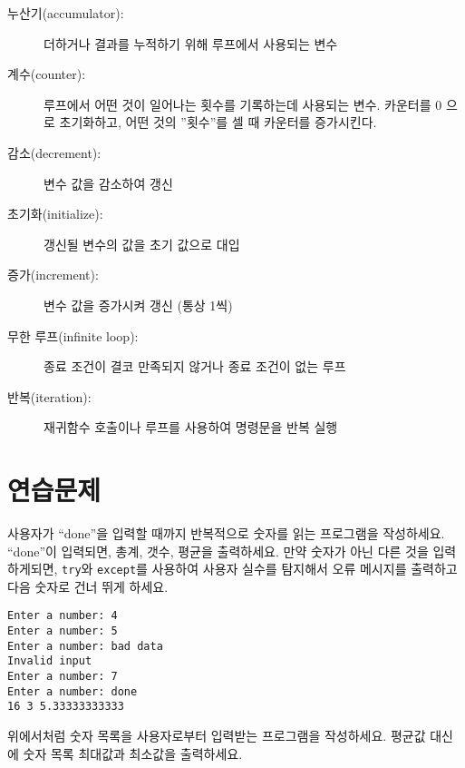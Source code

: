 \begin{description}

\item[누산기(accumulator):] 더하거나 결과를 누적하기 위해 루프에서 사용되는 변수

\item[계수(counter):] 루프에서 어떤 것이 일어나는 횟수를 기록하는데 사용되는 변수.
카운터를 0 으로 초기화하고, 어떤 것의 ''횟수''를 셀 때 카운터를 증가시킨다.

\item[감소(decrement):] 변수 값을 감소하여 갱신

\item[초기화(initialize):] 갱신될 변수의 값을 초기 값으로 대입

\item[증가(increment):] 변수 값을 증가시켜 갱신 (통상 1씩)

\item[무한 루프(infinite loop):] 종료 조건이 결코 만족되지 않거나 종료 조건이 없는 루프

\item[반복(iteration):] 재귀함수 호출이나 루프를 사용하여 명령문을 반복 실행

\end{description}

\section{  연습문제}

\begin{ex}
사용자가 ``done''을 입력할 때까지 반복적으로 숫자를 읽는 프로그램을 작성하세요.
``done''이 입력되면, 총계, 갯수, 평균을 출력하세요.
만약 숫자가 아닌 다른 것을 입력하게되면, {\tt try}와 {\tt except}를 사용하여 사용자 실수를 탐지해서
오류 메시지를 출력하고 다음 숫자로 건너 뛰게 하세요.

\begin{verbatim}
Enter a number: 4
Enter a number: 5
Enter a number: bad data
Invalid input
Enter a number: 7
Enter a number: done
16 3 5.33333333333
\end{verbatim}
\end{ex}

\begin{ex}
위에서처럼 숫자 목록을 사용자로부터 입력받는 프로그램을 작성하세요. 
평균값 대신에 숫자 목록 최대값과 최소값을 출력하세요.
\end{ex}


